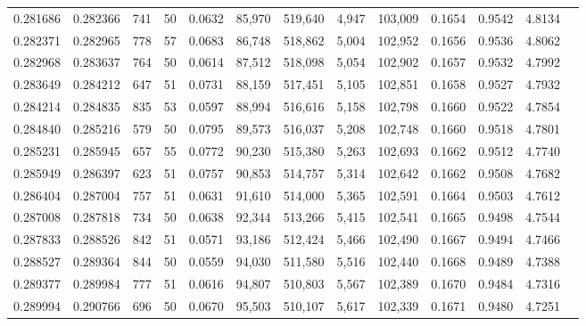 \begin{tabular}{rrrrrrrrrrrrr}
0.281686 & 0.282366 &   741 &  50 &                                     0.0632 &  85,970 & 519,640 &   4,947 & 103,009 & 0.1654 & 0.9542 & 4.8134 \\
0.282371 & 0.282965 &   778 &  57 &                                     0.0683 &  86,748 & 518,862 &   5,004 & 102,952 & 0.1656 & 0.9536 & 4.8062 \\
0.282968 & 0.283637 &   764 &  50 &                                     0.0614 &  87,512 & 518,098 &   5,054 & 102,902 & 0.1657 & 0.9532 & 4.7992 \\
0.283649 & 0.284212 &   647 &  51 &                                     0.0731 &  88,159 & 517,451 &   5,105 & 102,851 & 0.1658 & 0.9527 & 4.7932 \\
0.284214 & 0.284835 &   835 &  53 &                                     0.0597 &  88,994 & 516,616 &   5,158 & 102,798 & 0.1660 & 0.9522 & 4.7854 \\
0.284840 & 0.285216 &   579 &  50 &                                     0.0795 &  89,573 & 516,037 &   5,208 & 102,748 & 0.1660 & 0.9518 & 4.7801 \\
0.285231 & 0.285945 &   657 &  55 &                                     0.0772 &  90,230 & 515,380 &   5,263 & 102,693 & 0.1662 & 0.9512 & 4.7740 \\
0.285949 & 0.286397 &   623 &  51 &                                     0.0757 &  90,853 & 514,757 &   5,314 & 102,642 & 0.1662 & 0.9508 & 4.7682 \\
0.286404 & 0.287004 &   757 &  51 &                                     0.0631 &  91,610 & 514,000 &   5,365 & 102,591 & 0.1664 & 0.9503 & 4.7612 \\
0.287008 & 0.287818 &   734 &  50 &                                     0.0638 &  92,344 & 513,266 &   5,415 & 102,541 & 0.1665 & 0.9498 & 4.7544 \\
0.287833 & 0.288526 &   842 &  51 &                                     0.0571 &  93,186 & 512,424 &   5,466 & 102,490 & 0.1667 & 0.9494 & 4.7466 \\
0.288527 & 0.289364 &   844 &  50 &                                     0.0559 &  94,030 & 511,580 &   5,516 & 102,440 & 0.1668 & 0.9489 & 4.7388 \\
0.289377 & 0.289984 &   777 &  51 &                                     0.0616 &  94,807 & 510,803 &   5,567 & 102,389 & 0.1670 & 0.9484 & 4.7316 \\
0.289994 & 0.290766 &   696 &  50 &                                     0.0670 &  95,503 & 510,107 &   5,617 & 102,339 & 0.1671 & 0.9480 & 4.7251 \\

\end{tabular}
